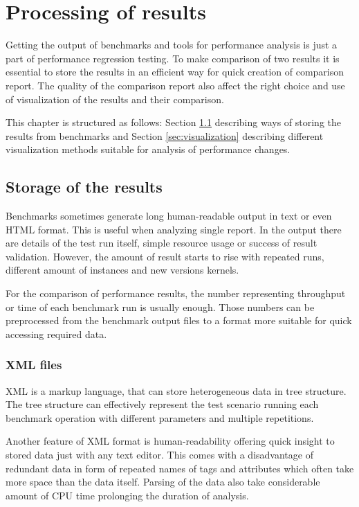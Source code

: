 \chapter{Processing of results} \label{ch:processing}
Getting the output of benchmarks and tools for performance analysis is just a
part of performance regression testing. To make comparison of two results it is
essential to store the results in an efficient way for quick creation of
comparison report. The quality of the comparison report also affect the right
choice and use of visualization of the results and their comparison.

This chapter is structured as follows: Section \ref{sec:storage} describing
ways of storing the results from benchmarks and Section \ref{sec:visualization}
describing different visualization methods suitable for analysis of performance
changes.

\section{Storage of the results} \label{sec:storage}
Benchmarks sometimes generate long human-readable output in text or even HTML
format. This is useful when analyzing single report. In the output there are details
of the test run itself, simple resource usage or success of result validation.
However, the amount of result starts to rise with repeated runs, different
amount of instances and new versions kernels.

For the comparison of performance results, the number representing throughput or
time of each benchmark run is usually enough. Those numbers can be preprocessed
from the benchmark output files to a format more suitable for quick accessing
required data.

\subsection{XML files}
XML is a markup language, that can store heterogeneous data in tree structure.
The tree structure can effectively represent the test scenario running each
benchmark operation with different parameters and multiple repetitions.

Another feature of XML format is human-readability offering quick insight to stored
data just with any text editor.
This comes with a disadvantage of redundant data in form of repeated names of
tags and attributes which often take more space than the data itself. Parsing of
the data also take considerable amount of CPU time prolonging the duration of
analysis.

